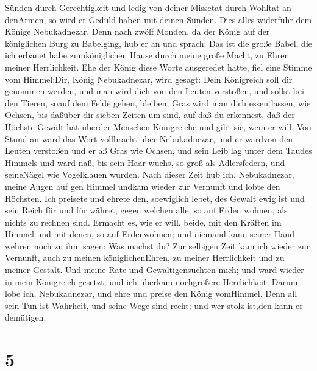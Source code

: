 Sünden durch Gerechtigkeit und ledig von deiner Missetat durch Wohltat
an denArmen, so wird er Geduld haben mit deinen Sünden. 
Dies alles widerfuhr dem Könige Nebukadnezar.  Denn nach
zwölf Monden, da der König auf der königlichen Burg zu Babelging,
 hub er an und sprach: Das ist die große Babel, die ich
erbauet habe zumköniglichen Hause durch meine große Macht, zu Ehren
meiner Herrlichkeit.  Ehe der König diese Worte ausgeredet
hatte, fiel eine Stimme vom Himmel:Dir, König Nebukadnezar, wird gesagt:
Dein Königreich soll dir genommen werden,  und man wird
dich von den Leuten verstoßen, und sollst bei den Tieren, soauf dem
Felde gehen, bleiben; Gras wird man dich essen lassen, wie Ochsen, bis
daßüber dir sieben Zeiten um sind, auf daß du erkennest, daß der Höchste
Gewalt hat überder Menschen Königreiche und gibt sie, wem er will.
 Von Stund an ward das Wort vollbracht über Nebukadnezar,
und er wardvon den Leuten verstoßen und er aß Gras wie Ochsen, und sein
Leib lag unter dem Taudes Himmels und ward naß, bis sein Haar wuchs, so
groß als Adlersfedern, und seineNägel wie Vogelklauen wurden.
 Nach dieser Zeit hub ich, Nebukadnezar, meine Augen auf
gen Himmel undkam wieder zur Vernunft und lobte den Höchsten. Ich
preisete und ehrete den, soewiglich lebet, des Gewalt ewig ist und sein
Reich für und für währet,  gegen welchen alle, so auf Erden
wohnen, als nichts zu rechnen sind. Ermacht es, wie er will, beide, mit
den Kräften im Himmel und mit denen, so auf Erdenwohnen; und niemand
kann seiner Hand wehren noch zu ihm sagen: Was machst du? 
Zur selbigen Zeit kam ich wieder zur Vernunft, auch zu meinen
königlichenEhren, zu meiner Herrlichkeit und zu meiner Gestalt. Und
meine Räte und Gewaltigensuchten mich; und ward wieder in mein
Königreich gesetzt; und ich überkam nochgrößere Herrlichkeit.
 Darum lobe ich, Nebukadnezar, und ehre und preise den
König vomHimmel. Denn all sein Tun ist Wahrheit, und seine Wege sind
recht; und wer stolz ist,den kann er demütigen.

\hypertarget{section-4}{%
\section{5}\label{section-4}}

